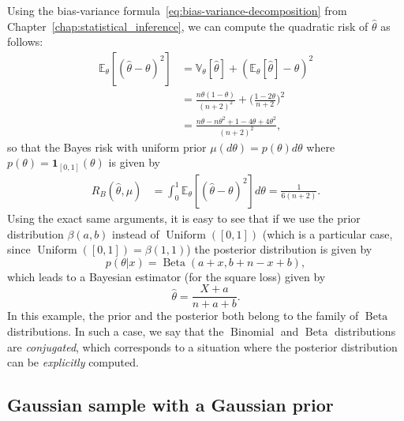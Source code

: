 \documentclass[
	fontsize=11pt, %
	twoside=false, %
	numbers=noenddot, %
]{kaobook}
\DeclareMathOperator{\bet}{Beta}
\DeclareMathOperator{\bin}{Binomial}
\DeclareMathOperator{\uni}{Uniform}
\newcommand{\E}{\mathbb E}
\newcommand{\var}{\mathbb V}
\newcommand{\wh}{\widehat}
\newcommand{\ind}[1]{\mathbf 1_{#1}}
\begin{document}
Using the bias-variance formula~\eqref{eq:bias-variance-decomposition} from Chapter~\ref{chap:statistical_inference}, we can compute the quadratic risk of $\wh \theta$ as follows:
\begin{align*}
	\E_\theta[ (\wh \theta - \theta)^2] &= \var_\theta[\wh \theta] + (\E_\theta[\wh \theta] - \theta)^2 \\
	&= \frac{n \theta(1 - \theta)}{(n + 2)^2} + \Big(\frac{1 - 2 \theta}{n + 2} \Big)^2 \\
	&= \frac{n \theta - n \theta^2 + 1 - 4 \theta + 4 \theta^2}{(n+2)^2},
\end{align*}
so that the Bayes risk with uniform prior $\mu(d \theta) = p(\theta) d\theta$ where $p(\theta) = \ind{[0, 1]}(\theta)$ is given by
\begin{align*}
	R_B(\wh \theta, \mu) &= \int_0^1 \E_\theta[ (\wh \theta - \theta)^2] d \theta 
	= \frac{1}{6(n+2)}.
\end{align*}
Using the exact same arguments, it is easy to see that if we use the prior distribution $\beta(a, b)$ instead of $\uni([0, 1])$ (which is a particular case, since $\uni([0, 1]) = \beta(1, 1)$) the posterior distribution is given by
\begin{equation*}
	p(\theta | x) = \bet(a + x, b + n - x + b),
\end{equation*}
which leads to a Bayesian estimator (for the square loss) given by
\begin{equation*}
	\wh \theta = \frac{X + a}{n + a + b}.
\end{equation*}
In this example, the prior and the posterior both belong to the family of $\bet$ distributions. 
In such a case, we say that the $\bin$ and $\bet$ distributions are \emph{conjugated}, which corresponds to a situation where the posterior distribution can be \emph{explicitly} computed.

\subsection{Gaussian sample with a Gaussian prior}
\end{document}
